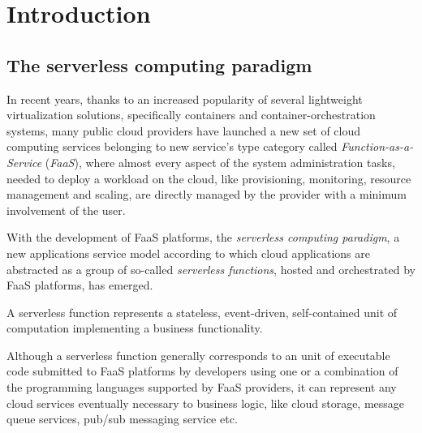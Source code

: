 \documentclass[12pt,a4paper]{report}
\begin{document}
	
\begin{frontespizio} 
\end{frontespizio} 
	
	
\tableofcontents

\chapter{Introduction}

\section{The serverless computing paradigm}

In recent years, thanks to an increased popularity of several lightweight virtualization solutions, specifically containers and container-orchestration systems, many public cloud providers have launched a new set of cloud computing services belonging to new service's type category called \textit{Function-as-a-Service} (\textit{FaaS}), where almost every aspect of the system administration tasks, needed to deploy a workload on the cloud, like provisioning, monitoring, resource management and scaling, are directly managed by the provider with a minimum involvement of the user.

With the development of FaaS platforms, the \textit{serverless computing paradigm}, a new applications service model according to which cloud applications are abstracted as a group of so-called \textit{serverless functions}, hosted and orchestrated by FaaS platforms, has emerged. 

A serverless function represents a stateless, event-driven, self-contained unit of computation implementing a business functionality.

Although a serverless function generally corresponds to an unit of executable code submitted to FaaS platforms by developers using one or a combination of the programming languages supported by FaaS providers, it can represent any cloud services eventually necessary to business logic, like cloud storage, message queue services, pub/sub messaging service etc.
\end{document}
